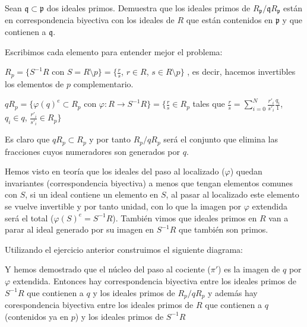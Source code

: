 \begin{problem}
	Sean $\mathfrak{q}\subset \mathfrak{p}$ dos ideales primos. Demuestra que los ideales primos de $R_\mathfrak{p}/\mathfrak{q}R_\mathfrak{p}$ están en correspondencia biyectiva con los ideales de $R$ que están contenidos en $\mathfrak{p}$ y que contienen a $\mathfrak{q}$.


	\solution
	
	Escribimos cada elemento para entender mejor el problema: 
	
	$R_p = \{S^{-1}R $ con $ S=R \setminus p \} = \{\frac{r}{s}$, $r \in R$, $s \in R\setminus p \}$ , es decir, hacemos invertibles los elementos de $p$ complementario.
	
	$qR_p = \{ \varphi(q)^e\subset R_p$ con $\varphi : R \rightarrow S^{-1}R\} = \{\frac{r}{s} \in R_p$ tales que $\frac{r}{s} = \sum^N_{i=0} \frac{r'_i}{s'_i} \frac{q_i}{1}$, $q_i\in q$, $\frac{r'_i}{s'_i}\in R_p\}$
	
	Es claro que $qR_p \subset R_p$ y por tanto $R_p/qR_p$ será el conjunto que elimina las fracciones cuyos numeradores son generados por $q$.
	
	Hemos visto en teoría que los ideales del paso al localizado ($\varphi$) quedan invariantes (correspondencia biyectiva) a menos que tengan elementos comunes con $S$, si un ideal contiene un elemento en $S$, al pasar al localizado este elemento se vuelve invertible y por tanto unidad, con lo que la imagen por $\varphi$ extendida será el total ($\varphi(S)^e = S^{-1}R$). También vimos que ideales primos en $R$ van a parar al ideal generado por su imagen en $S^{-1}R$ que también son primos.
	
	Utilizando el ejercicio anterior construimos el siguiente diagrama:
	
	
	Y hemos demostrado que el núcleo del paso al cociente ($\pi '$) es la imagen de $q$ por $\varphi$ extendida. Entonces hay correspondencia biyectiva entre los ideales primos de $S^{-1}R$ que contienen a $q$ y los ideales primos de $R_p/qR_p$ y además hay corespondencia biyectiva entre los ideales primos de $R$ que contienen a $q$ (contenidos ya en $p$) y los ideales primos de $S^{-1}R$
	
\end{problem}

